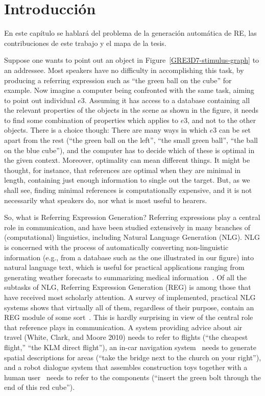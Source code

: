\chapter{Introducci\'on}
En este cap\'itulo se hablar\'a del problema de la generaci\'on autom\'atica de RE, las contribuciones de este trabajo y el mapa de la tesis.

Suppose one wants to point out an object in Figure~\ref{GRE3D7-stimulus-graph} to an addressee. Most speakers
have no difficulty in accomplishing this task, by producing a referring expression
such as ``the green ball on the cube'' for example. Now imagine a computer being confronted
with the same task, aiming to point out individual $e3$. Assuming it has access to a
database containing all the relevant properties of the objects in the scene as shown in the figure, it needs to
find some combination of properties which applies to $e3$, and not to the other objects.
There is a choice though: There are many ways in which $e3$ can be set apart from the
rest (``the green ball on the left'', ``the small green ball'', ``the ball on the blue cube''), and
the computer has to decide which of these is optimal in the given context. Moreover,
optimality can mean different things. It might be thought, for instance, that references
are optimal when they are minimal in length, containing just enough information to
single out the target. But, as we shall see, finding minimal references is computationally
expensive, and it is not necessarily what speakers do, nor what is most useful to hearers.

So, what is Referring Expression Generation? Referring expressions play a central role
in communication, and have been studied extensively in many branches of (computational) linguistics, including Natural Language Generation (NLG). NLG is concerned with the process of automatically converting non-linguistic information (e.g.,
from a database such as the one illustrated in our figure) into natural language text, which is useful for practical applications
ranging from generating weather forecasts to summarizing medical information~\cite{dale2000}. Of all the subtasks of NLG, Referring Expression Generation (REG) is
among those that have received most scholarly attention. A survey of implemented,
practical NLG systems shows that virtually all of them, regardless of their purpose,
contain an REG module of some sort~\cite{Mellish2004}. This is hardly surprising
in view of the central role that reference plays in communication. A system providing
advice about air travel (White, Clark, and Moore 2010) needs to refer to flights (“the
cheapest flight,” “the KLM direct flight”), an in-car navigation system~\cite{Drager:2012:GLN:2380816.2380908}
needs to generate spatial descriptions for areas (“take the bridge next to the church on your right”), and a robot dialogue system that assembles construction
toys together with a human user~\cite{foster-etal-ijcai2009} needs to refer to the components
(“insert the green bolt through the end of this red cube”).


